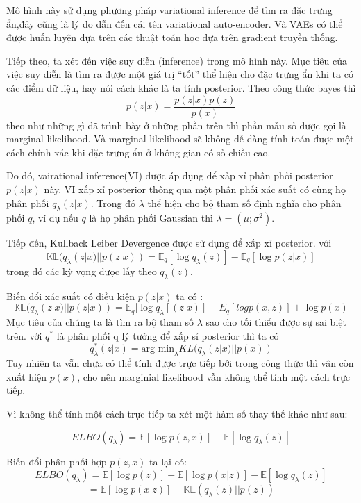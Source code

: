         Mô hình này sử dụng phương pháp variational inference để tìm ra đặc trưng ẩn,đây cũng là lý do dẫn đến cái tên variational auto-encoder. Và VAEs có thể được huấn luyện dựa trên các thuật toán  học dựa trên gradient truyền thống.
        
        
        Tiếp theo, ta xét đến việc suy diễn (inference) trong mô hình này. 
        Mục tiêu của việc suy diễn là tìm ra được một giá trị ``tốt'' thể hiện cho đặc trưng ẩn khi ta có các điểm dữ liệu, hay nói cách khác là ta tính posterior.
        Theo công thức bayes thì 
        $$p(z|x) = \frac{p(z|x)p(z)}{p(x)}$$
        theo như những gì đã trình bày ở những phần trên thì phần mẫu số được gọi là marginal likelihood. 
        Và marginal likelihood sẽ không dễ dàng tính toán được một cách chính xác khi đặc trưng ẩn ở không gian có số chiều cao. 

        Do đó, vairational inference(VI) được áp dụng để xấp xỉ phân phối posterior $p(z|x)$ này.
        VI xấp xỉ posterior thông qua một phân phối xác suất có cùng họ phân phối $q_\lambda(z|x)$.
        Trong đó $\lambda$ thể hiện cho bộ tham số định nghĩa cho phân phối $q$, ví dụ nếu $q$ là  họ phân phối Gaussian thì $\lambda = (\mu;\sigma^2)$.
        
        Tiếp đến, Kullback Leiber Devergence được sử dụng để xấp xỉ posterior. 
        với
        $$\mathbb{KL}(q_\lambda(z|x) || p (z|x)) = \mathbb{E}_q[\log q_\lambda(z)] - \mathbb{E}_q[\log p(z|x)]$$
        trong đó các kỳ vọng đưọc lấy theo $q_\lambda(z)$.
        
        Biến đổi xác suất có điều kiện $p(z|x)$ ta có :        
        $$ \mathbb{KL}(q_\lambda(z|x) || p (z|x)) =   \mathbb{E}_q[\log q_\lambda[(z|x)] - E_q[log p(x,z)] + \log p(x)$$
        Mục tiêu của chúng ta là tìm ra bộ tham số $\lambda$ sao cho tối thiểu được sự sai biệt trên. với $q^*$ là phân phối q lý tưởng để xấp sỉ posterior thì ta có
        $$q^*_\lambda(z|x) = \text{arg min}_\lambda KL(q_\lambda(z|x)|| p(x))$$
        Tuy nhiên ta vẫn chưa có thể tính được trực tiếp bởi trong công thức thì vân còn xuất hiện $p(x)$, cho nên marginial likelihood vẫn không thể tính một cách trực tiếp.

        Vì không thể tính một cách trực tiếp ta xét một hàm số thay thế khác như sau:

        $$ELBO(q_\lambda) = \mathbb{E}[\log p(z,x)] - \mathbb{E}[\log q_\lambda(z)]$$
        
        Biến đổi phân phối hợp $p(z,x)$ ta lại có: 
        $$ELBO(q_\lambda) = \mathbb{E}[\log p(z)]+ \mathbb{E}[\log p(x|z)] - \mathbb{E}[\log q_\lambda(z)] $$
        $$= \mathbb{E}[\log p(x|z)] - \mathbb{KL}( q_\lambda(z)|| p(z))$$
        

